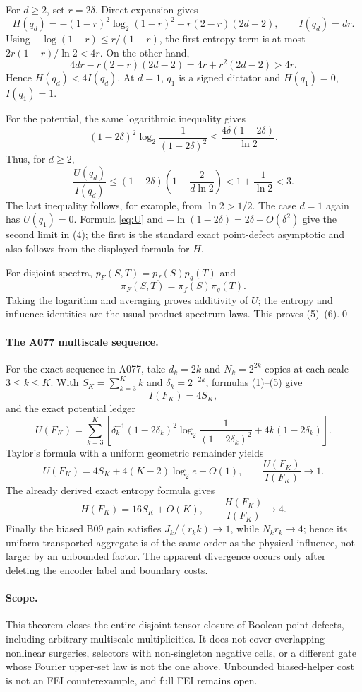 For $d\ge2$, set $r=2\delta$.  Direct expansion gives
\[
 H(q_d)=-(1-r)^2\log_2(1-r)^2+r(2-r)(2d-2),
 \qquad I(q_d)=dr.
\]
Using $-\log(1-r)\le r/(1-r)$, the first entropy term is at most
$2r(1-r)/\ln2<4r$.  On the other hand,
\[
 4dr-r(2-r)(2d-2)=4r+r^2(2d-2)>4r.
\]
Hence $H(q_d)<4I(q_d)$.  At $d=1$, $q_1$ is a signed dictator and
$H(q_1)=0$, $I(q_1)=1$.

For the potential, the same logarithmic inequality gives
\[
 (1-2\delta)^2\log_2\frac1{(1-2\delta)^2}
 \le \frac{4\delta(1-2\delta)}{\ln2}.
\]
Thus, for $d\ge2$,
\[
 \frac{U(q_d)}{I(q_d)}
 \le(1-2\delta)\left(1+\frac{2}{d\ln2}\right)
 <1+\frac1{\ln2}<3.
\]
The last inequality follows, for example, from $\ln2>1/2$.  The case
$d=1$ again has $U(q_1)=0$.  Formula \eqref{eq:U} and
$-\ln(1-2\delta)=2\delta+O(\delta^2)$ give the second limit in (4); the
first is the standard exact point-defect asymptotic and also follows from
the displayed formula for $H$.

For disjoint spectra, $p_{F}(S,T)=p_f(S)p_g(T)$ and
\[
 \pi_F(S,T)=\pi_f(S)\pi_g(T).
\]
Taking the logarithm and averaging proves additivity of $U$; the entropy
and influence identities are the usual product-spectrum laws.  This proves
(5)--(6).\qed

\paragraph{The A077 multiscale sequence.}
For the exact sequence in A077, take $d_k=2k$ and $N_k=2^{2k}$ copies at
each scale $3\le k\le K$.  With
$S_K=\sum_{k=3}^Kk$ and $\delta_k=2^{-2k}$, formulas (1)--(5) give
\[
 I(F_K)=4S_K,
\]
and the exact potential ledger
\[
 U(F_K)=\sum_{k=3}^K\left[
 \delta_k^{-1}(1-2\delta_k)^2
 \log_2\frac1{(1-2\delta_k)^2}
 +4k(1-2\delta_k)\right].                             \tag{7}
\]
Taylor's formula with a uniform geometric remainder yields
\[
 U(F_K)=4S_K+4(K-2)\log_2e+O(1),
 \qquad \frac{U(F_K)}{I(F_K)}\longrightarrow1.         \tag{8}
\]
The already derived exact entropy formula gives
\[
 H(F_K)=16S_K+O(K),
 \qquad \frac{H(F_K)}{I(F_K)}\longrightarrow4.         \tag{9}
\]
Finally the biased B09 gain satisfies $J_k/(r_kk)\to1$, while
$N_kr_k\to4$; hence its uniform transported aggregate is of the same order
as the physical influence, not larger by an unbounded factor.  The apparent
divergence occurs only after deleting the encoder label and boundary costs.

\paragraph{Scope.}
This theorem closes the entire disjoint tensor closure of Boolean point
defects, including arbitrary multiscale multiplicities.  It does not cover
overlapping nonlinear surgeries, selectors with non-singleton negative
cells, or a different gate whose Fourier upper-set law is not the one above.
Unbounded biased-helper cost is not an FEI counterexample, and full FEI
remains open.
